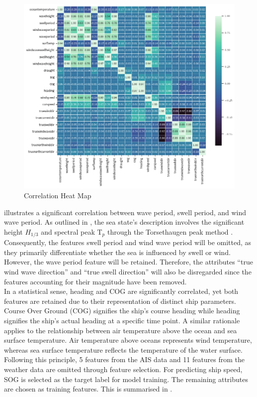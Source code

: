 \begin{figure}[h!]
    \centering
    \includegraphics[width=.9\linewidth,height=.9\textheight,keepaspectratio]{02_figures/heatmap_corr_ovr.png}
    \caption{Correlation Heat Map}
    \label{fig:heatmap_ovr}
\end{figure}

 illustrates a significant correlation between wave period, swell period, and wind wave period. As outlined in , the sea state's description involves the significant height $H_{1/3}$ and spectral peak $\text{T}_p$ through the Torsethaugen peak method . Consequently, the features swell period and wind wave period will be omitted, as they primarily differentiate whether the sea is influenced by swell or wind. However, the wave period feature will be retained. Therefore, the attributes ``true wind wave direction'' and ``true swell direction'' will also be disregarded since the features accounting for their magnitude have been removed.\\

In a statistical sense, heading and COG are significantly correlated, yet both features are retained due to their representation of distinct ship parameters. Course Over Ground (COG) signifies the ship's course heading while heading signifies the ship's actual heading at a specific time point. A similar rationale applies to the relationship between air temperature above the ocean and sea surface temperature. Air temperature above oceans represents wind temperature, whereas sea surface temperature reflects the temperature of the water surface. Following this principle, 5 features from the AIS data and 11 features from the weather data are omitted through feature selection. For predicting ship speed, SOG is selected as the target label for model training. The remaining attributes are chosen as training features. This is summarised in .\\

